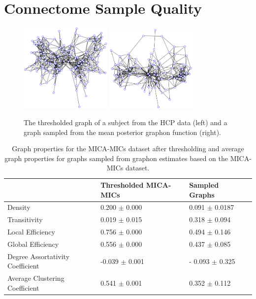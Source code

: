\documentclass[11pt]{report} %
\begin{document}
\section{Connectome Sample Quality}
\label{connectomesamplequaliyresults}
\begin{figure}[H]
    \center
    \includegraphics[width= 0.4\textwidth]{subject_graph}%
    \hfill
    \includegraphics[width= 0.4\textwidth]{sampled_graph}%
    \caption{The thresholded graph of a subject from the HCP data (left) and a graph sampled from the mean posterior graphon function (right).}
\end{figure}
\begin{table}[h]
\caption{Graph properties for the MICA-MICs dataset after thresholding and average graph properties for graphs sampled from graphon estimates based on the MICA-MICs dataset.}
\begin{tabular}{|l|l|l|l|}
\hline
 & \textbf{Thresholded MICA-MICs} & \textbf{Sampled Graphs}  \\ \hline
Density           & 0.200 $\pm$ 0.000  & 0.091 $\pm$ 0.0187\\ \hline
Transitivity      & 0.019 $\pm$ 0.015  & 0.318 $\pm$ 0.094\\ \hline
Local Efficiency  & 0.756 $\pm$ 0.000  & 0.494 $\pm$ 0.146 \\ \hline
Global Efficiency & 0.556 $\pm$ 0.000  & 0.437 $\pm$ 0.085\\ \hline
Degree Assortativity Coefficient  & -0.039 $\pm$ 0.001 & - 0.093 $\pm$ 0.325\\ \hline
Average Clustering Coefficient    & 0.541 $\pm$ 0.001  &  0.352 $\pm$ 0.112 \\ \hline
\end{tabular}
\end{table}
\end{document}
